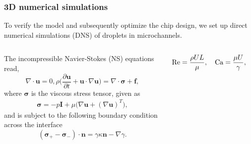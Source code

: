 \begin{frame}
  \frametitle{3D numerical simulations}

  To verify the model and subsequently optimize the chip design, we set up direct numerical simulations (DNS) of droplets in microchannels.
  \vskip0.3cm

  \pause
  \begin{columns}[T]

    \begin{column}{0.55\textwidth}
      \begin{bluecolorbox}
        The incompressible Navier-Stokes (NS) equations read,
        \begin{subequations} \label{eq:Navier-Sotkes}
          \begin{equation}
            \nabla \cdot {\bm u} = 0,
            \label{eq:div-free}
          \end{equation}
          \begin{equation}
            \rho \bigg(\frac{\partial {\bm u}}{\partial t} + {\bm u} \cdot \nabla {\bm u} \bigg) = \nabla \cdot {\bm \sigma} + {\bm f},
            \label{eq:NS}
          \end{equation}
        \end{subequations}
        where $\bm \sigma$ is the viscous stress tensor, given as
        \begin{equation}
          \begin{aligned}
            {\bm \sigma} = -p {\bm I}+ \mu \bigg( \nabla {\bm u} + (\nabla {\bm u})^T \bigg),
          \end{aligned}
        \end{equation}
        and is subject to the following boundary condition across the interface
        \begin{equation} \label{eq:stress-bc}
          ({\bm \sigma}_+ - {\bm \sigma}_- ) \cdot {\bm n} = \gamma \kappa {\bm n} - \nabla \gamma.
        \end{equation}
      \end{bluecolorbox}
    \end{column}

    \pause
    \begin{column}{0.4\textwidth}
      \centering
      \begin{bluecolorbox}
        \begin{equation} \notag
          \begin{aligned}
            \textrm{Re} = \frac{\rho UL}{\mu}, \quad
            \textrm{Ca} = \frac{\mu U}{\gamma}, \quad
            \textrm{Fr} = \frac{U^2}{FL}.  
          \end{aligned}
        \end{equation}
      \end{bluecolorbox}
      \vskip0.2cm


\end{column}
\end{columns}
\end{frame}
